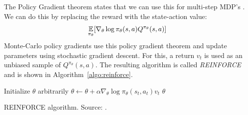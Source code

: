The Policy Gradient theorem states that we can use this for multi-step MDP's \parencite{Sutton1999PolicyApproximation}. We can do this by replacing the reward with the state-action value:
\begin{equation}
\operatorname*{\mathop{{}\mathbb{E}}}_{\pi_{\theta}} [\nabla_{\theta} \log \pi_{\theta}(s,a)Q^{\pi_{\theta}}(s,a)]
\end{equation}
Monte-Carlo policy gradients use this policy gradient theorem and update parameters using stochastic gradient descent. For this, a return $v_t$ is used as an unbiased sample of $Q^{\pi_{\theta}}(s,a)$. The resulting algorithm is called \textit{REINFORCE} \parencite{williams1992simple} and is shown in Algorithm~\ref{algo:reinforce}.\\
\begin{algorithm}[htb]
\DontPrintSemicolon
Initialize $\theta$ arbitrarily\;
 {
     {
        $\theta \gets \theta + \alpha \nabla_{\theta} \log \pi_{\theta}(s_t,a_t)v_t$
    }
}
\Return $\theta$
\caption[REINFORCE]{REINFORCE algorithm. Source: \cite{Sutton1998ReinforcementIntroduction}.}
\label{algo:reinforce}
\end{algorithm}

